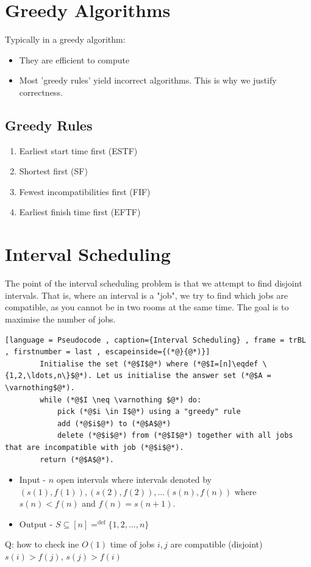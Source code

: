 \documentclass[a4paper]{article}
\theoremstyle{plain}
\newcommand*{\MyDef}{\mathrm{def}}
\newcommand*{\eqdef}{\ensuremath{\mathop{\overset{\MyDef}{=}}}}
\theoremstyle{definition}
\theoremstyle{remark}
\begin{document}
	\section{Greedy Algorithms}
	Typically in a greedy algorithm:
	\begin{itemize}
		\item They are efficient to compute
		\item Most 'greedy rules' yield incorrect algorithms. This is why we justify correctness.
	\end{itemize}
	\subsection{Greedy Rules}
		\begin{enumerate}
			\item Earliest start time first (ESTF) 
			\item Shortest first (SF)
			\item Fewest incompatibilities first (FIF)
			\item Earliest finish time first (EFTF)
		\end{enumerate}
	\section{Interval Scheduling}
	The point of the interval scheduling problem is that we attempt to find disjoint intervals. That is, where an interval is a "job", we try to find which jobs are compatible, as you cannot be in two rooms at the same time. The goal is to maximise the number of jobs.
	\begin{lstlisting}[language = Pseudocode , caption={Interval Scheduling} , frame = trBL , firstnumber = last , escapeinside={(*@}{@*)}]
		Initialise the set (*@$I$@*) where (*@$I=[n]\eqdef \{1,2,\ldots,n\}$@*). Let us initialise the answer set (*@$A = \varnothing$@*).
		while (*@$I \neq \varnothing $@*) do: 
			pick (*@$i \in I$@*) using a "greedy" rule 
			add (*@$i$@*) to (*@$A$@*) 
			delete (*@$i$@*) from (*@$I$@*) together with all jobs that are incompatible with job (*@$i$@*).
		return (*@$A$@*).
	\end{lstlisting}

	\begin{itemize}
		\item Input - $n$ open intervals where intervals denoted by $(s(1),f(1)),(s(2),f(2)),\ldots (s(n), f(n))$ where $s(n)<f(n)$ and $f(n)=  s(n+1)$.
		\item Output - $S \subseteq [n] =^\text{def} \{1,2,\ldots,n\}$
	\end{itemize} 
	Q: how to check ine $O(1)$ time of jobs $i,j$ are compatible (disjoint) \\
	$s(i) > f(j)$, $s(j) > f(i)$
\end{document}
